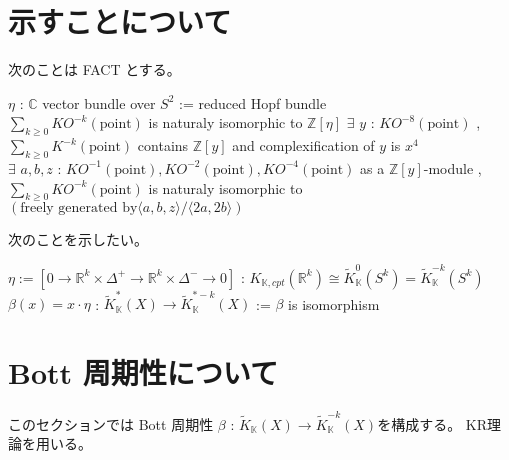 \documentclass[dvipdfmx]{jsarticle}
\begin{document}
\section*{示すことについて}

次のことは FACT とする。
\begin{Theorem}
\itemprop
  \Let \(\eta\) : \(\mathbb{C}\) vector bundle over \(S^2\) := reduced Hopf bundle \\
  \Then \(\sum_{k \geq 0} KO^{-k}(\text{point})\) is naturaly isomorphic to \(\mathbb{Z}[\eta]\)
\itemprop
  \Then \(\exists\) \(y\) : \(KO^{-8}(\text{point})\) , \(\sum_{k \geq 0} K^{-k}(\text{point})\) contains \(\mathbb{Z}[y]\) and complexification of \(y\) is \(x^4\) \\
  \Then \(\exists\) \(a,b,z\) : \(KO^{-1}(\text{point}),KO^{-2}(\text{point}),KO^{-4}(\text{point})\) as a \(\mathbb{Z}[y]\)-module , \(\sum_{k \geq 0} KO^{-k}(\text{point})\) is naturaly isomorphic to \((\text{freely generated by}\langle a , b , z \rangle / \langle 2a , 2b \rangle)\)
\end{Theorem}
次のことを示したい。

\begin{Theorem}
\itemdefi \(\eta := [0 \to \mathbb{R}^{k} \times \Delta^+ \to \mathbb{R}^{k} \times \Delta^- \to 0]\) : \(K_{\mathbb{K},cpt}(\mathbb{R}^k) \cong \tilde{K}_{\mathbb{K}}^{0}(S^k) = \tilde{K}_{\mathbb{K}}^{-k}(S^k)\)
\itemprop \(\beta(x) = x \cdot \eta\) : \(\tilde{K}_{\mathbb{K}}^{*}(X) \to \tilde{K}_{\mathbb{K}}^{*-k}(X)\) := \(\beta\) is isomorphism
\end{Theorem}

\section*{Bott 周期性について}
このセクションでは Bott 周期性 \(\beta\) : \(\tilde{K}_{\mathbb{K}}(X) \to \tilde{K}_{\mathbb{K}}^{-k}(X)\)を構成する。
KR理論を用いる。
\end{document}

